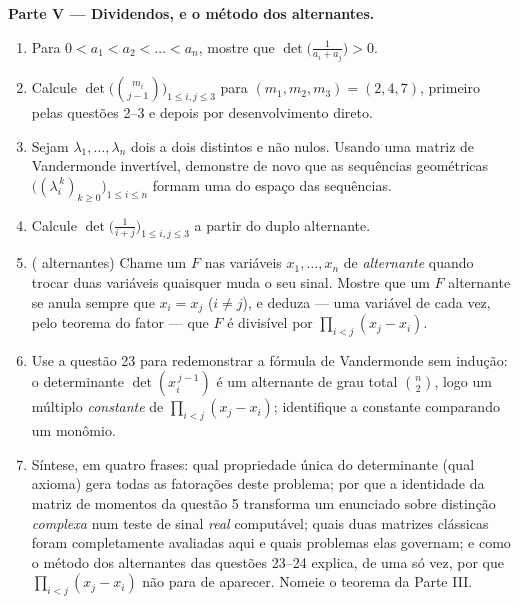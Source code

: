 \begin{problem}
\medskip
\noindent\textbf{Parte V --- Dividendos, e o método dos
alternantes.}
\begin{enumerate}[resume]
  \item Para $0 < a_1 < a_2 < \dots < a_n$, mostre que $\det\bigl(\frac{1}{a_i + a_j}\bigr) > 0$.
  \item Calcule $\det\bigl(\binom{m_i}{j-1}\bigr)_{1 \leq i, j
        \leq 3}$ para $(m_1, m_2, m_3) = (2, 4, 7)$, primeiro pelas questões 2--3 e
        depois por desenvolvimento direto.
  \item Sejam $\lambda_1, \dots, \lambda_n$ dois a dois distintos e não nulos. Usando uma
        matriz de Vandermonde invertível, demonstre de novo que as
        sequências geométricas $\bigl((\lambda_i^{\,k})_{k \geq 0}\bigr)_{1 \leq i \leq
        n}$ formam uma  do
        espaço das sequências.
  \item Calcule $\det\bigl(\frac{1}{i + j}\bigr)_{1 \leq i, j
        \leq 3}$ a partir do duplo alternante.
  \item ( alternantes) Chame um  $F$ nas
        variáveis $x_1,
        \dots, x_n$ de \emph{alternante} quando trocar duas
        variáveis quaisquer muda o seu sinal. Mostre que um $F$
        alternante se anula sempre que $x_i = x_j$ ($i \neq j$), e deduza ---
        uma variável de cada vez, pelo teorema do fator --- que $F$
        é divisível por $\prod_{i<j}(x_j - x_i)$.
  \item Use a questão 23 para redemonstrar a fórmula de Vandermonde
        sem indução: o determinante $\det(x_i^{\,j-1})$ é um  alternante
        de grau total $\binom n2$, logo um múltiplo \emph{constante} de
        $\prod_{i<j}(x_j -
        x_i)$; identifique a constante comparando um monômio.
  \item Síntese, em quatro frases: qual propriedade única do
        determinante (qual axioma) gera todas as fatorações deste
        problema; por que a identidade da matriz de momentos da
        questão 5 transforma um enunciado sobre distinção
        \emph{complexa} num teste de sinal \emph{real} computável;
        quais duas matrizes clássicas foram completamente avaliadas
        aqui e quais problemas  elas governam; e como o
        método dos alternantes das questões 23--24 explica, de uma
        só vez, por que $\prod_{i<j}(x_j -
        x_i)$ não para de aparecer. Nomeie o
        teorema da Parte III.
\end{enumerate}
\end{problem}
